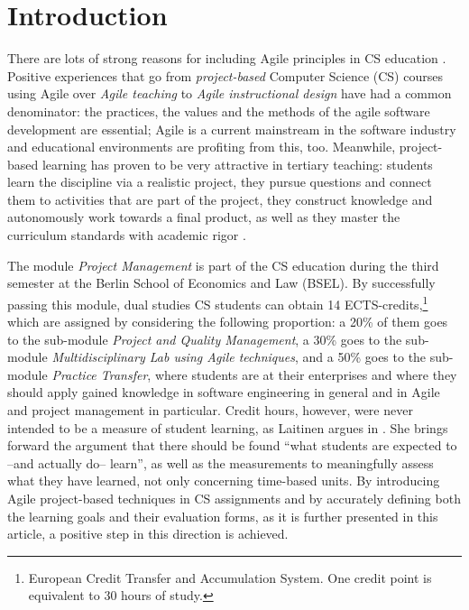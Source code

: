 \documentclass[conference]{IEEEtran}
\begin{document}
\section{Introduction}
\label{sec:intro}

There are lots of strong reasons for including Agile principles in CS education \cite{HaDu07}. Positive experiences that go from \textit{project-based} Computer Science (CS) courses using Agile \cite{Pe09,Scetal12} over \textit{Agile teaching} \cite{RaAn06} to \textit{Agile instructional design} \cite{LeVa12} have had a common denominator: the practices, the values and the methods of the agile software development are essential; Agile is a current mainstream in the software industry \cite{VO13} and educational environments are profiting from this, too. Meanwhile, project-based learning has proven to be very attractive in tertiary teaching: students learn the discipline via a realistic project, they pursue questions and connect them to activities that are part of the project, they construct knowledge and autonomously work towards a final product, as well as they master the curriculum standards with academic rigor \cite{Th00}.

The module \textit{Project Management} is part of the CS education during the third semester at the Berlin School of Economics and Law (BSEL). By successfully passing this module, dual studies CS students can obtain 14 ECTS-credits,\footnote{European Credit Transfer and Accumulation System. One credit point is equivalent to 30 hours of study.} which are assigned by considering the following proportion: a 20\% of them goes to the sub-module \textit{Project and Quality Management}, a 30\% goes to the sub-module \textit{Multidisciplinary Lab using Agile techniques}, and a 50\% goes to the sub-module \textit{Practice Transfer}, where students are at their enterprises and where they should apply gained knowledge in software engineering in general and in Agile and project management in particular. Credit hours, however, were never intended to be a measure of student learning, as Laitinen argues in \cite{La13}. She brings forward the argument that there should be found ``what students are expected to --and actually do-- learn'', as well as the measurements to meaningfully assess what they have learned, not only concerning time-based units. By introducing Agile project-based techniques in CS assignments and by accurately defining both the learning goals and their evaluation forms, as it is further presented in this article, a positive step in this direction is achieved. 
\end{document}
